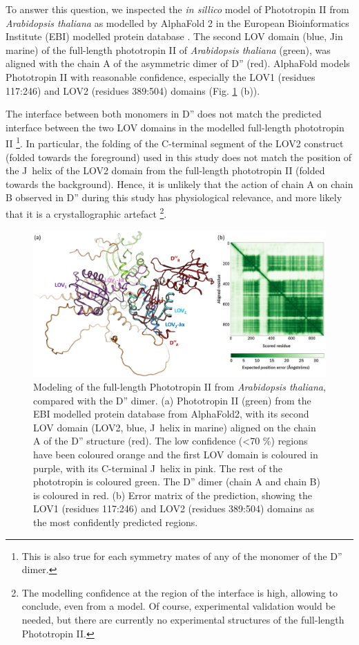 To answer this question, we inspected the \textit{in sillico} model of Phototropin II from \textit{Arabidopsis thaliana }as modelled by AlphaFold 2 \parencite{jumperHighlyAccurateProtein2021} in the European Bioinformatics Institute (EBI) modelled protein database \parencite{varadiAlphaFoldProteinStructure2022}. The second LOV domain (blue, J\textalpha in marine) of the full-length phototropin II of \textit{Arabidopsis thaliana} (green), was aligned with the chain A of the asymmetric dimer of D'' (red). AlphaFold models Phototropin II with reasonable confidence, especially the LOV1 (residues 117:246) and LOV2 (residues 389:504) domains (Fig. \ref{fig:PhotII_AF2} (b)). 

The interface between both monomers in D'' does not match the predicted interface between the two LOV domains in the modelled full-length phototropin II \footnote{This is also true for each symmetry mates of any of the monomer of the D'' dimer.}. In particular, the folding of the C-terminal segment of the LOV2 construct (folded towards the foreground) used in this study does not match the position of the J\textalpha\ helix of the LOV2 domain from the full-length phototropin II (folded towards the background). Hence, it is unlikely that the action of chain A on chain B observed in D'' during this study has physiological relevance, and more likely that it is a crystallographic artefact \footnote{The modelling confidence at the region of the interface is high, allowing to conclude, even from a model. Of course, experimental validation would be needed, but there are currently no experimental structures of the full-length Phototropin II.}. 

\begin{figure}[H] %
    \centering
    \noindent \includegraphics[width=\textwidth]{images/LOV2/PhotII_struc.pdf}
    \hfill
    \caption{Modeling of the full-length Phototropin II from \textit{Arabidopsis thaliana}, compared with the D'' dimer. (a) Phototropin II (green) from the EBI modelled protein database from AlphaFold2, with its second LOV domain (LOV2, blue, J\textalpha\ helix in marine) aligned on the chain A of the D'' structure (red). The low confidence (<70 \%) regions have been coloured orange and the first LOV domain is coloured in purple, with its C-terminal J\textalpha\ helix in pink. The rest of the phototropin is coloured green. The D'' dimer (chain A and chain B) is coloured in red. (b) Error matrix of the prediction, showing  the LOV1 (residues 117:246) and LOV2 (residues 389:504) domains as the most confidently predicted regions.}\label{fig:PhotII_AF2}
\end{figure}

